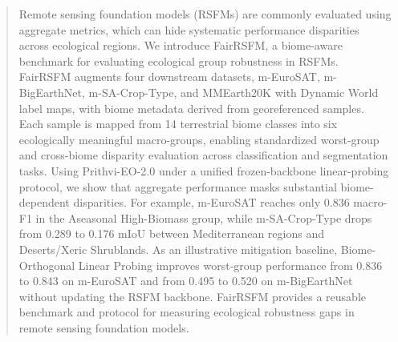 \documentclass[10pt,twocolumn,letterpaper]{article}
\newcommand{\method}{FairRSFM\xspace}
\begin{document}
\begin{abstract}
Remote sensing foundation models (RSFMs) are commonly evaluated using aggregate metrics, which can hide systematic performance disparities across ecological regions. We introduce FairRSFM, a biome-aware benchmark for evaluating ecological group robustness in RSFMs. FairRSFM augments four downstream datasets, m-EuroSAT, m-BigEarthNet, m-SA-Crop-Type, and MMEarth20K with Dynamic World label maps, with biome metadata derived from georeferenced samples. Each sample is mapped from 14 terrestrial biome classes into six ecologically meaningful macro-groups, enabling standardized worst-group and cross-biome disparity evaluation across classification and segmentation tasks. Using Prithvi-EO-2.0 under a unified frozen-backbone linear-probing protocol, we show that aggregate performance masks substantial biome-dependent disparities. For example, m-EuroSAT reaches only 0.836 macro-F1 in the Aseasonal High-Biomass group, while m-SA-Crop-Type drops from 0.289 to 0.176 mIoU between Mediterranean regions and Deserts/Xeric Shrublands. As an illustrative mitigation baseline, Biome-Orthogonal Linear Probing improves worst-group performance from 0.836 to 0.843 on m-EuroSAT and from 0.495 to 0.520 on m-BigEarthNet without updating the RSFM backbone. FairRSFM provides a reusable benchmark and protocol for measuring ecological robustness gaps in remote sensing foundation models.
\end{abstract}

\end{document}
